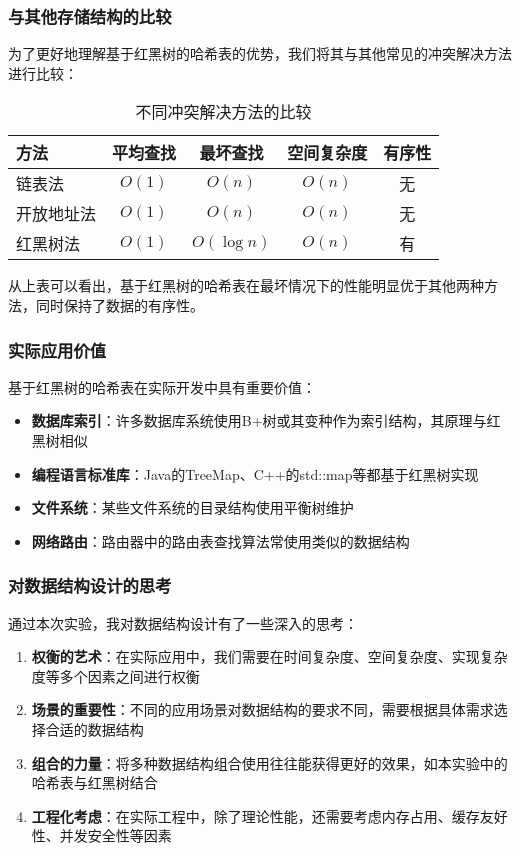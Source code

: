 \documentclass[12pt,a4paper]{article}
\begin{document}
\subsubsection{与其他存储结构的比较}
为了更好地理解基于红黑树的哈希表的优势，我们将其与其他常见的冲突解决方法进行比较：

\begin{table}[h]
\centering
\caption{不同冲突解决方法的比较}
\begin{tabular}{|l|c|c|c|c|}
\hline
方法 & 平均查找 & 最坏查找 & 空间复杂度 & 有序性 \\
\hline
链表法 & $O(1)$ & $O(n)$ & $O(n)$ & 无 \\
开放地址法 & $O(1)$ & $O(n)$ & $O(n)$ & 无 \\
红黑树法 & $O(1)$ & $O(\log n)$ & $O(n)$ & 有 \\
\hline
\end{tabular}
\end{table}

从上表可以看出，基于红黑树的哈希表在最坏情况下的性能明显优于其他两种方法，同时保持了数据的有序性。

\subsubsection{实际应用价值}
基于红黑树的哈希表在实际开发中具有重要价值：

\begin{itemize}
\item \textbf{数据库索引}：许多数据库系统使用B+树或其变种作为索引结构，其原理与红黑树相似
\item \textbf{编程语言标准库}：Java的TreeMap、C++的std::map等都基于红黑树实现
\item \textbf{文件系统}：某些文件系统的目录结构使用平衡树维护
\item \textbf{网络路由}：路由器中的路由表查找算法常使用类似的数据结构
\end{itemize}

\subsubsection{对数据结构设计的思考}
通过本次实验，我对数据结构设计有了一些深入的思考：

\begin{enumerate}
\item \textbf{权衡的艺术}：在实际应用中，我们需要在时间复杂度、空间复杂度、实现复杂度等多个因素之间进行权衡
\item \textbf{场景的重要性}：不同的应用场景对数据结构的要求不同，需要根据具体需求选择合适的数据结构
\item \textbf{组合的力量}：将多种数据结构组合使用往往能获得更好的效果，如本实验中的哈希表与红黑树结合
\item \textbf{工程化考虑}：在实际工程中，除了理论性能，还需要考虑内存占用、缓存友好性、并发安全性等因素
\end{enumerate}
\end{document}
